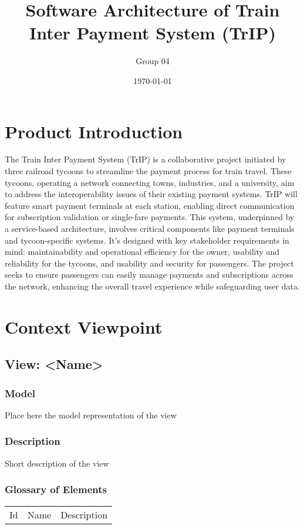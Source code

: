 \documentclass{article}
\title{Software Architecture of Train Inter Payment System (TrIP)}
\author{Group 04}
\date{\today}
\begin{document}
\maketitle
\newpage

\section*{Product Introduction}
The Train Inter Payment System (TrIP) is a collaborative project initiated by three railroad tycoons to streamline the payment process for train travel. These tycoons, operating a network connecting towns, industries, and a university, aim to address the interoperability issues of their existing payment systems. TrIP will feature smart payment terminals at each station, enabling direct communication for subscription validation or single-fare payments. This system, underpinned by a service-based architecture, involves critical components like payment terminals and tycoon-specific systems. It's designed with key stakeholder requirements in mind: maintainability and operational efficiency for the owner, usability and reliability for the tycoons, and usability and security for passengers. The project seeks to ensure passengers can easily manage payments and subscriptions across the network, enhancing the overall travel experience while safeguarding user data.

\newpage

\newpage

\newpage


\section*{Context Viewpoint}
\subsection*{View: \textless{}Name\textgreater{}}
\subsubsection*{Model}
Place here the model representation of the view

\subsubsection*{Description}
Short description of the view

\subsubsection*{Glossary of Elements}
\begin{longtable}{lll}
Id & Name & Description \\
\end{longtable}
\end{document}
